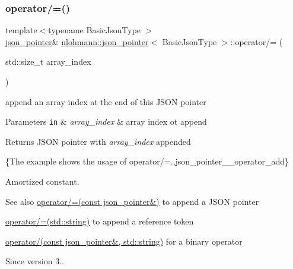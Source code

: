 \subsubsection{\texorpdfstring{operator/=()}{operator/=()}\hspace{0.1cm}{\footnotesize\ttfamily [3/3]}}
{\footnotesize\ttfamily template$<$typename Basic\+Json\+Type $>$ \\
\hyperlink{classnlohmann_1_1json__pointer}{json\+\_\+pointer}\& \hyperlink{classnlohmann_1_1json__pointer}{nlohmann\+::json\+\_\+pointer}$<$ Basic\+Json\+Type $>$\+::operator/= (\begin{DoxyParamCaption}\item[{std\+::size\+\_\+t}]{array\+\_\+index }\end{DoxyParamCaption})\hspace{0.3cm}{\ttfamily [inline]}}



append an array index at the end of this J\+S\+ON pointer 


\begin{DoxyParams}[1]{Parameters}
\mbox{\tt in}  & {\em array\+\_\+index} & array index ot append \\
\hline
\end{DoxyParams}
\begin{DoxyReturn}{Returns}
J\+S\+ON pointer with {\itshape array\+\_\+index} appended
\end{DoxyReturn}
\{The example shows the usage of {\ttfamily operator/=}.,json\+\_\+pointer\+\_\+\+\_\+operator\+\_\+add\}

Amortized constant.

\begin{DoxySeeAlso}{See also}
\hyperlink{classnlohmann_1_1json__pointer_a7395bd0af29ac23fd3f21543c935cdfa}{operator/=(const json\+\_\+pointer\&)} to append a J\+S\+ON pointer 

\hyperlink{classnlohmann_1_1json__pointer_abdd21567b2b1d69329af0f520335e68b}{operator/=(std\+::string)} to append a reference token 

\hyperlink{classnlohmann_1_1json__pointer_a926c9065dbed1bedc17857a813f7a46f}{operator/(const json\+\_\+pointer\&, std\+::string)} for a binary operator
\end{DoxySeeAlso}
\begin{DoxySince}{Since}
version 3.. 
\end{DoxySince}
\mbox{\label{classnlohmann_1_1json__pointer_afdaacce1edb7145e0434e014f0e8685a}} 
